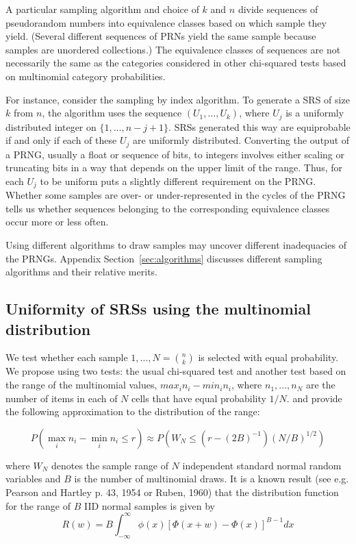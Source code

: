 \documentclass[12pt]{article}
\begin{document}
A particular sampling algorithm and choice of $k$ and $n$ divide sequences of pseudorandom numbers into equivalence classes based on which sample they yield.
(Several different sequences of PRNs yield the same sample because samples are unordered collections.)
The equivalence classes of sequences are not necessarily the same as the categories considered in other chi-squared tests based on multinomial category probabilities.

For instance, consider the sampling by index algorithm.
To generate a SRS of size $k$ from $n$, the algorithm uses the sequence $(U_1, \dots, U_k)$, where 
$U_j$ is a uniformly distributed integer on $\{1, \dots, n - j + 1\}$.
SRSs generated this way are equiprobable if and only if each of these $U_j$ are uniformly distributed.
Converting the output of a PRNG, usually a float or sequence of bits, to integers involves either scaling or truncating bits in a way that depends on the upper limit of the range.
Thus, for each $U_j$ to be uniform puts a slightly different requirement on the PRNG.
Whether some samples are over- or under-represented in the cycles of the PRNG tells us whether sequences belonging to the corresponding equivalence classes occur more or less often.

Using different algorithms to draw samples may uncover different inadequacies of the PRNGs.
Appendix Section~\ref{sec:algorithms} discusses different sampling algorithms and their relative merits.

\subsection{Uniformity of SRSs using the multinomial distribution}

We test whether each sample $1, \dots, N = {n \choose k}$ is selected with equal probability. 
We propose using two tests: the usual chi-squared test and another test based on the range of the multinomial values, $max_i n_i - min_i n_i$, where $n_1, \dots, n_N$ are the number of items in each of $N$ cells that have equal probability $1/N$.
\citet{johnson_applications_1960} and \citet{young_two_1962} provide the following approximation to the distribution of the range:

$$P(\max_i n_i - \min_i n_i \leq r) \approx P(W_N \leq (r-(2B)^{-1})(N/B)^{1/2})$$

\noindent where $W_N$ denotes the sample range of $N$ independent standard normal random variables and $B$ is the number of multinomial draws. 
It is a known result (see e.g. Pearson and Hartley p. 43, 1954 or Ruben, 1960) that the distribution function for the range of $B$ IID normal samples is given by
$$R(w) = B \int_{-\infty}^{\infty} \phi(x)\left[ \Phi(x+w) - \Phi(x)\right]^{B-1}dx$$
\end{document}
